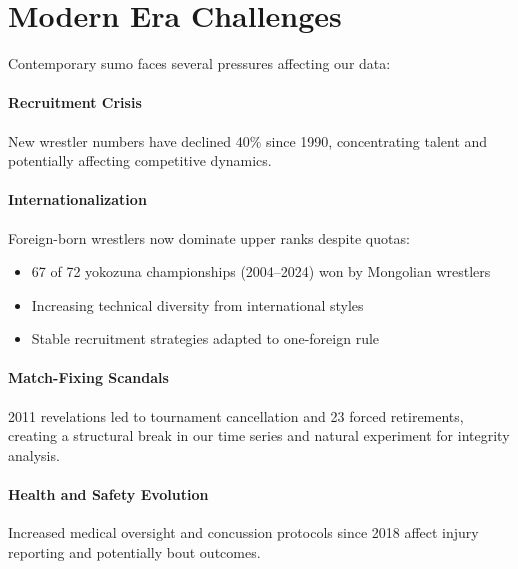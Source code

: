 \section{Modern Era Challenges}

Contemporary sumo faces several pressures affecting our data:

\paragraph{Recruitment Crisis}
New wrestler numbers have declined 40\% since 1990, concentrating talent and potentially affecting competitive dynamics.

\paragraph{Internationalization}
Foreign-born wrestlers now dominate upper ranks despite quotas:
\begin{itemize}
\item 67 of 72 yokozuna championships (2004--2024) won by Mongolian wrestlers
\item Increasing technical diversity from international styles
\item Stable recruitment strategies adapted to one-foreign rule
\end{itemize}

\paragraph{Match-Fixing Scandals}
2011 revelations led to tournament cancellation and 23 forced retirements, creating a structural break in our time series and natural experiment for integrity analysis.

\paragraph{Health and Safety Evolution}
Increased medical oversight and concussion protocols since 2018 affect injury reporting and potentially bout outcomes.